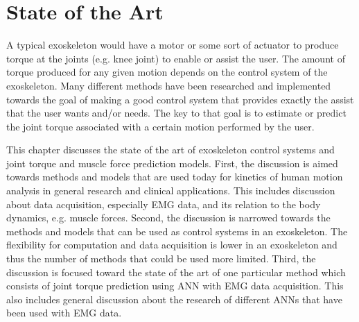 \section{State of the Art}
A typical exoskeleton would have a motor or some sort of actuator to produce torque at the joints (e.g. knee joint) to enable or assist the user.
The amount of torque produced for any given motion depends on the control system of the exoskeleton.
Many different methods have been researched and implemented towards the goal of making a good control system that provides exactly the assist that the user wants and/or needs.
The key to that goal is to estimate or predict the joint torque associated with a certain motion performed by the user.

This chapter discusses the state of the art of exoskeleton control systems and joint torque and muscle force prediction models.
First, the discussion is aimed towards methods and models that are used today for kinetics of human motion analysis in general research and clinical applications.
This includes discussion about data acquisition, especially \ac{EMG} data, and its relation to the body dynamics, e.g. muscle forces.
Second, the discussion is narrowed towards the methods and models that can be used as control systems in an exoskeleton.
The flexibility for computation and data acquisition is lower in an exoskeleton and thus the number of methods that could be used more limited.
Third, the discussion is focused toward the state of the art of one particular method which consists of joint torque prediction using \ac{ANN} with \ac{EMG} data acquisition. 
This also includes general discussion about the research of different \acp{ANN} that have been used with \ac{EMG} data.



